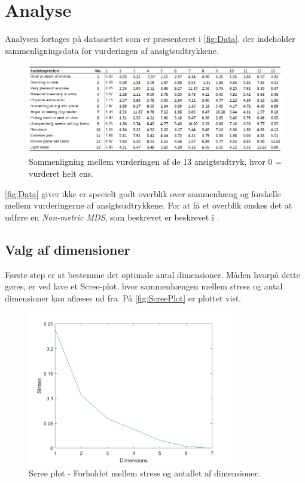 \section*{Analyse}
\label{Analyse}
%
Analysen fortages på datasættet som er præsenteret i \autoref{fig:Data}, der indeholder sammenligningsdata for vurderingen af ansigtsudtrykkene. 

\begin{figure}[H]
\centering
\includegraphics[width = \textwidth]{Figure/Data.PNG} 
\caption{Sammenligning mellem vurderingen af de 13 ansigtsudtryk, hvor 0 = vurderet helt ens.}
\label{fig:Data}
\end{figure}

\noindent \autoref{fig:Data} giver ikke er specielt godt overblik over sammenhæng og forskelle mellem vurderingerne af ansigtsudtrykkene. For at få et overblik ønskes det at udføre en \textit{Non-metric MDS}, som beskrevet er beskrevet i . 

\subsection*{Valg af dimensioner}
Første step er at bestemme det optimale antal dimensioner. Måden hvorpå dette gøres, er ved lave et Scree-plot, hvor sammenhængen mellem stress og antal dimensioner kan aflæses ud fra. På \autoref{fig:ScreePlot} er plottet vist. 

\begin{figure}[H]
\centering
\includegraphics[width = 0.8\textwidth]{Figure/screeplot.png} 
\caption{Scree plot - Forholdet mellem stress og antallet af dimensioner.}
\label{fig:ScreePlot}
\end{figure}

